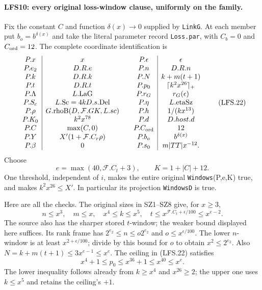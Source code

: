 \paragraph{LFS10: every original loss-window clause, uniformly on the family.}
\label{claim:LFS10}
Fix the constant $C$ and function $\delta(x)\to0$ supplied by
\texttt{LinkG}.  At each member put $b_o=b^{\delta(x)}$ and take
the literal parameter record \texttt{Loss.par}, with
$C_b=0$ and $C_{\rm ord}=12$.
The complete coordinate identification is
\[
\begin{array}{c|c@{\qquad}c|c}
 P.x&x&P.\epsilon&\epsilon\\
 P.e_2&D.R.e&P.n& D.R.n\\
 P.k&D.R.k&P.N& k+m(t+1)\\
 P.t&D.R.t&P.p_0&\lceil k^2x^{26}\rceil_+\\
 P.\Lambda&L.\mathrm{LaG}&P.r_G&r_G(\epsilon)\\
 P.S_c&L.\mathrm{Sc}=4kD.s.\mathrm{Del}&P.\eta&L.\mathrm{etaSz}\\
 P.\rho&G.\mathrm{rhoB}(D,\mathcal F.GK,L.sc)&P.h&1/(kx^{13})\\
 P.K_0&k^2x^{78}&P.d&D.host.d\\
 P.C&\max(C,0)&P.C_{\rm ord}&12\\
 P.Y&X'(1+\mathcal F.C_r\rho)&P.b_o&b^{\delta(x)}\\
 P.\beta&0&P.s_0&m|TT|x^{-12}.
\end{array}                                                   \tag{LFS.22}
\]
Choose
\[
                 e=\max(40,\mathcal F.C_t+3),\qquad
                 K=1+|C|+12.                                \tag{LFS.23}
\]
One threshold, independent of $i$, makes the entire original
\texttt{Windows}(P,e,K) true, and makes $k^2x^{26}\le X'$.
In particular its projection \texttt{WindowsD} is true.

Here are all the checks.  The original sizes in SZ1--SZ8 give,
for $x\ge3$,
\[
 n\le x^3,\quad m\le x,\quad x^4\le k\le x^5,
 \quad t\le x^{\mathcal F.C_t+\epsilon/100}
                   \le x^{e-2}.                              \tag{LFS.24}
\]
The source also has the sharper stored $t$-window; the weaker
bound displayed here suffices.  Its rank frame has
$2^{e_2}\le n\le o2^{e_2}$ and $o\le x^{\epsilon/100}$.
The lower $n$-window is at least $x^{2+\epsilon/100}$;
divide by this bound for $o$ to obtain $x^2\le2^{e_2}$.
Also $N=k+m(t+1)\le3x^{e-1}\le x^e$.
The ceiling in (LFS.22) satisfies
\[
 x^4+1\le p_0\le x^{36}+1\le x^{40}\le x^e.
\]
The lower inequality follows already from $k\ge x^4$ and
$x^{26}\ge2$; the upper one uses $k\le x^5$ and retains the
ceiling's $+1$.

